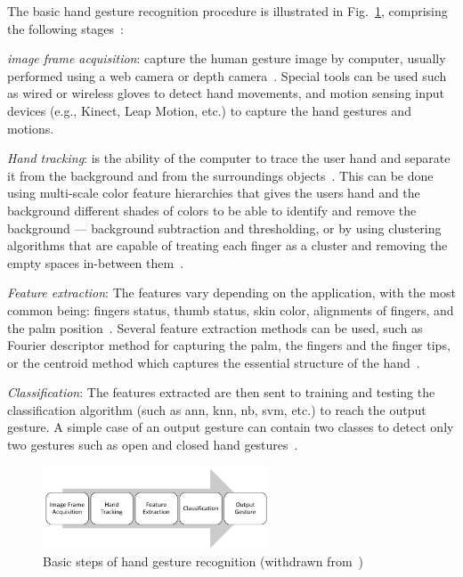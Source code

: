 The basic hand gesture recognition procedure is illustrated in Fig.~\ref{fig:hand-gesture-recog-procedure}, comprising
the following stages~\cite{yasen2019systematic}:
\begin{item-c}
\item \emph{image frame acquisition}:
  capture the human gesture image by
  computer, usually performed using a web camera or depth
  camera~\cite{choudhury2015review}.
  Special tools
  can be used such as wired or wireless gloves to detect hand movements, and
  motion sensing input devices (e.g., Kinect, Leap Motion, etc.) to capture the
  hand gestures and motions.
\item \emph{Hand tracking}:
  is the ability of the computer to trace the user
  hand and separate it from the background and from the surroundings
  objects~\cite{choudhury2015review}. This can be done using multi-scale color
  feature hierarchies that gives the users hand and the background different
  shades of colors to be able to identify and remove the background ---
  background subtraction and thresholding, or by using clustering algorithms
  that are capable of treating each finger as a cluster and removing the empty
  spaces in-between them~\cite{yasen2019systematic}.
\item \emph{Feature extraction}:
  The features vary depending on the application, with the most common being:
  fingers status, thumb status, skin color, alignments of fingers, and the palm
  position~\cite{choudhury2015review}. Several feature extraction methods can be
  used, such as Fourier descriptor method for capturing the palm, the fingers
  and the finger tips, or the centroid method which captures the essential
  structure of the hand~\cite{yasen2019systematic}.
\item \emph{Classification}: The features extracted are then sent to training
  and testing the classification algorithm
  (such as \gls{ann}, \gls{knn}, \gls{nb}, \gls{svm}, etc.)
  to reach the output gesture. A simple
  case of an output gesture can contain two classes to detect only two gestures
  such as open and closed hand gestures~\cite{yasen2019systematic}.
\end{item-c}
\begin{figure}[!hbt]
\centering
    \includegraphics[width=0.6\textwidth]{./img/hand-gesture-recog-procedure.png}
  \caption{Basic steps of hand gesture recognition (withdrawn from~\cite{yasen2019systematic})}%
\label{fig:hand-gesture-recog-procedure}
\end{figure}

